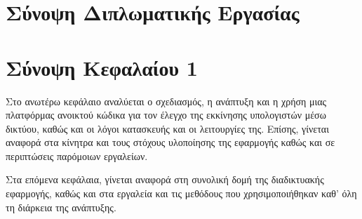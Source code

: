 \section{Σύνοψη Διπλωματικής Εργασίας}

\section{Σύνοψη Κεφαλαίου 1}
Στο ανωτέρω κεφάλαιο αναλύεται ο σχεδιασμός, η ανάπτυξη και η χρήση μιας πλατφόρμας ανοικτού κώδικα για τον έλεγχο της εκκίνησης υπολογιστών μέσω δικτύου, καθώς και οι λόγοι κατασκευής και οι λειτουργίες της. Επίσης, γίνεται αναφορά στα κίνητρα και τους στόχους υλοποίησης της εφαρμογής καθώς και σε περιπτώσεις παρόμοιων εργαλείων.

Στα επόμενα κεφάλαια, γίνεται αναφορά στη συνολική δομή της διαδικτυακής εφαρμογής, καθώς και στα εργαλεία και τις μεθόδους που χρησιμοποιήθηκαν καθ' όλη τη διάρκεια της ανάπτυξης.
